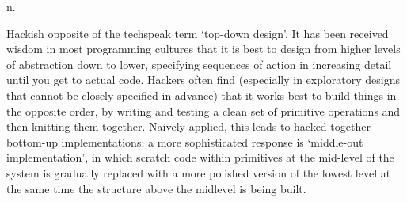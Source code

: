  n.

Hackish opposite of the techspeak term `top-down design'. It has been received
wisdom in most programming cultures that it is best to design from higher levels
of abstraction down to lower, specifying sequences of action in increasing
detail until you get to actual code. Hackers often find (especially in
exploratory designs that cannot be closely specified in advance) that it works
best to build things in the opposite order, by writing and testing a clean set
of primitive operations and then knitting them together. Naively applied, this
leads to hacked-together bottom-up implementations; a more sophisticated
response is `middle-out implementation', in which scratch code within primitives
at the mid-level of the system is gradually replaced with a more polished
version of the lowest level at the same time the structure above the midlevel is
being built.

